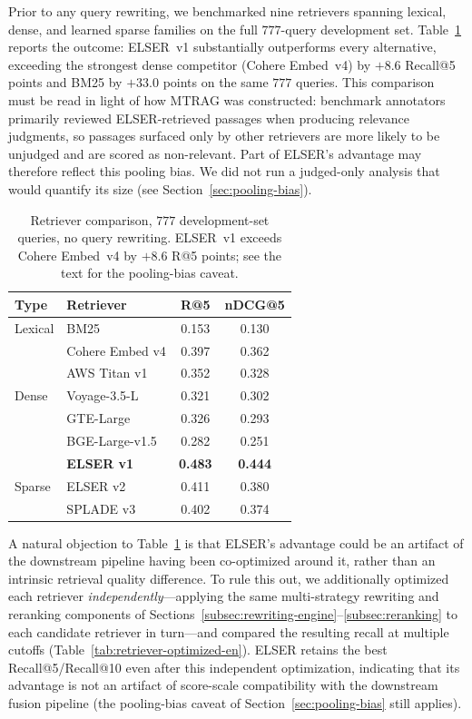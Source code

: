 Prior to any query rewriting, we benchmarked nine retrievers spanning lexical, dense, and learned sparse families on the full $777$-query development set. Table~\ref{tab:retriever-comparison-en} reports the outcome: ELSER~v1 substantially outperforms every alternative, exceeding the strongest dense competitor (Cohere Embed~v4) by $+8.6$ Recall@5 points and BM25 by $+33.0$ points on the same $777$ queries. This comparison must be read in light of how MTRAG was constructed: benchmark annotators primarily reviewed ELSER-retrieved passages when producing relevance judgments, so passages surfaced only by other retrievers are more likely to be unjudged and are scored as non-relevant. Part of ELSER's advantage may therefore reflect this pooling bias. We did not run a judged-only analysis that would quantify its size (see Section~\ref{sec:pooling-bias}).

\begin{table}[h]
\centering
\small
\begin{tabular}{llcc}
\toprule
\textbf{Type} & \textbf{Retriever} & \textbf{R@5} & \textbf{nDCG@5} \\
\midrule
Lexical & BM25 & 0.153 & 0.130 \\
\midrule
\multirow{5}{*}{Dense} & Cohere Embed v4 & 0.397 & 0.362 \\
& AWS Titan v1 & 0.352 & 0.328 \\
& Voyage-3.5-L & 0.321 & 0.302 \\
& GTE-Large & 0.326 & 0.293 \\
& BGE-Large-v1.5 & 0.282 & 0.251 \\
\midrule
\multirow{3}{*}{Sparse} & \textbf{ELSER v1} & \textbf{0.483} & \textbf{0.444} \\
& ELSER v2 & 0.411 & 0.380 \\
& SPLADE v3 & 0.402 & 0.374 \\
\bottomrule
\end{tabular}
\caption{Retriever comparison, $777$ development-set queries, no query rewriting. ELSER~v1 exceeds Cohere Embed~v4 by $+8.6$ R@5 points; see the text for the pooling-bias caveat.}
\label{tab:retriever-comparison-en}
\end{table}

A natural objection to Table~\ref{tab:retriever-comparison-en} is that ELSER's advantage could be an artifact of the downstream pipeline having been co-optimized around it, rather than an intrinsic retrieval quality difference. To rule this out, we additionally optimized each retriever \emph{independently}---applying the same multi-strategy rewriting and reranking components of Sections~\ref{subsec:rewriting-engine}--\ref{subsec:reranking} to each candidate retriever in turn---and compared the resulting recall at multiple cutoffs (Table~\ref{tab:retriever-optimized-en}). ELSER retains the best Recall@5/Recall@10 even after this independent optimization, indicating that its advantage is not an artifact of score-scale compatibility with the downstream fusion pipeline (the pooling-bias caveat of Section~\ref{sec:pooling-bias} still applies).

